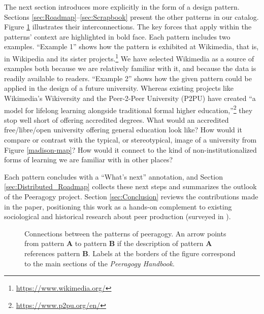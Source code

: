 The next section introduces  more explicitly in the form of a design pattern.  Sections \ref{sec:Roadmap}--\ref{sec:Scrapbook} present the other patterns in our catalog.  Figure \ref{fig:connections} illustrates their interconnections.  The key forces that apply within the patterns' context are highlighted in bold face.  Each pattern includes two examples. ``Example 1'' shows how the pattern is exhibited at Wikimedia, that is, in Wikipedia and its sister
projects.\footnote{\url{https://www.wikimedia.org/}}  We have selected Wikimedia as a source of examples both because we are relatively familiar with it, and because the data is readily available to readers. ``Example 2'' shows how the given pattern could be applied in the design of a future university.  Whereas existing projects like Wikimedia's Wikiversity and the Peer-2-Peer University (P2PU) have created ``a model for lifelong learning alongside traditional formal higher education,''\footnote{\url{https://www.p2pu.org/en/}} they stop well short of offering accredited degrees.  What would an accredited free/libre/open university offering general education look like?  How would it compare or contrast with the typical, or stereotypical, image of a university from Figure \ref{madison-map}?  How would it connect to the kind of non-institutionalized forms of learning we are familiar with in other places?

Each pattern concludes with a ``What's next'' annotation, and Section \ref{sec:Distributed_Roadmap} collects these next steps and summarizes the outlook of the Peeragogy project.  Section \ref{sec:Conclusion} reviews the contributions made in the paper, positioning this work as a hands-on complement to existing sociological and historical research about peer production (surveyed in \cite{benkler2015peer}).

\begin{figure}
\vspace{-.9in}
{\centering


\par
}
\vspace{-.9in}
\caption{Connections between the patterns of peeragogy.  An arrow points from pattern \textbf{A} to pattern \textbf{B} if the description of pattern \textbf{A} references pattern \textbf{B}. Labels at the borders of the figure correspond to the main sections of the \emph{Peeragogy Handbook}.\label{fig:connections}}
\end{figure}

